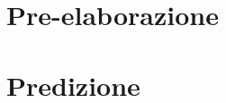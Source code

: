 \documentclass[%
    corpo=12pt,
    twoside,
    oldstyle,
    autoretitolo,
    greek,
    evenboxes,
]{toptesi}
\begin{document}




\chapter{Pre-elaborazione}
\label{chap:preprocessing}



\chapter{Predizione}
\label{chap:forecasting}
\end{document}
